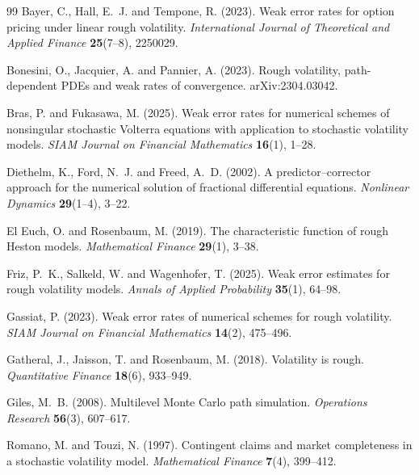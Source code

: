 \documentclass{ws-ijtaf}
\begin{document}
\begin{thebibliography}{99}
 Bayer, C., Hall, E.~J. and Tempone, R. (2023).
Weak error rates for option pricing under linear rough volatility.
\emph{International Journal of Theoretical and Applied Finance} \textbf{25}(7--8), 2250029.

 Bonesini, O., Jacquier, A. and Pannier, A. (2023).
Rough volatility, path-dependent PDEs and weak rates of convergence.
arXiv:2304.03042.

 Bras, P. and Fukasawa, M. (2025).
Weak error rates for numerical schemes of nonsingular stochastic Volterra
equations with application to stochastic volatility models.
\emph{SIAM Journal on Financial Mathematics} \textbf{16}(1), 1--28.

 Diethelm, K., Ford, N.~J. and Freed, A.~D. (2002).
A predictor--corrector approach for the numerical solution of fractional differential
equations. \emph{Nonlinear Dynamics} \textbf{29}(1--4), 3--22.

 El Euch, O. and Rosenbaum, M. (2019).
The characteristic function of rough Heston models.
\emph{Mathematical Finance} \textbf{29}(1), 3--38.

 Friz, P.~K., Salkeld, W. and Wagenhofer, T. (2025).
Weak error estimates for rough volatility models.
\emph{Annals of Applied Probability} \textbf{35}(1), 64--98.

 Gassiat, P. (2023).
Weak error rates of numerical schemes for rough volatility.
\emph{SIAM Journal on Financial Mathematics} \textbf{14}(2), 475--496.

 Gatheral, J., Jaisson, T. and Rosenbaum, M. (2018).
Volatility is rough. \emph{Quantitative Finance} \textbf{18}(6), 933--949.

 Giles, M.~B. (2008).
Multilevel Monte Carlo path simulation.
\emph{Operations Research} \textbf{56}(3), 607--617.

 Romano, M. and Touzi, N. (1997).
Contingent claims and market completeness in a stochastic volatility model.
\emph{Mathematical Finance} \textbf{7}(4), 399--412.

\end{thebibliography}
\end{document}
